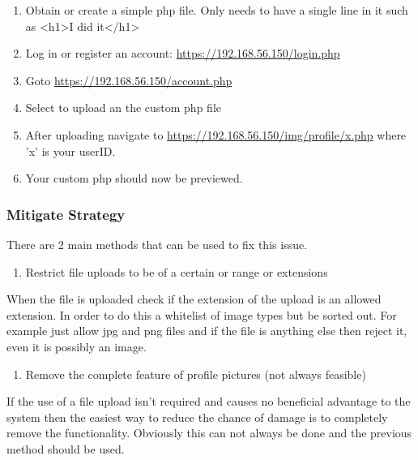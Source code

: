 \documentclass[titlepage]{article}
\begin{document}
      \begin{enumerate}
         \item Obtain or create a simple php file. Only needs to have a single line in it such as <h1>I did it</h1>
         \item Log in or register an account: \url{https://192.168.56.150/login.php}
         \item Goto \url{https://192.168.56.150/account.php}
         \item Select to upload an the custom php file
         \item After uploading navigate to \url{https://192.168.56.150/img/profile/x.php} where 'x' is your userID.
         \item Your custom php should now be previewed.
      \end{enumerate}


      \subsubsection{Mitigate Strategy} %
      \label{ssub:unrestricted_file_upload_mitigate_strategy}
      
      There are 2 main methods that can be used to fix this issue.

      \begin{enumerate}
         \item Restrict file uploads to be of a certain or range or extensions
      \end{enumerate}
      When the file is uploaded check if the extension of the upload is an allowed extension. In order to do this a whitelist of image types but be sorted out. For example just allow jpg and png files and if the file is anything else then reject it, even it is possibly an image. 
      \begin{enumerate}[resume]
         \item Remove the complete feature of profile pictures (not always feasible)
      \end{enumerate}
      If the use of a file upload isn't required and causes no beneficial advantage to the system then the easiest way to reduce the chance of damage is to completely remove the functionality. Obviously this can not always be done and the previous method should be used. 



   
\end{document}
